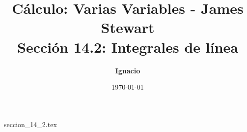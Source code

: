 \documentclass[11pt,spanish,oneside]{report}
\title{\textbf{Cálculo: Varias Variables - James Stewart} \\ \Large Sección 14.2: Integrales de línea}
\author{\textbf{Ignacio}}
\date{\today}
\begin{document}
\maketitle

{seccion_14_2.tex}
\end{document}
